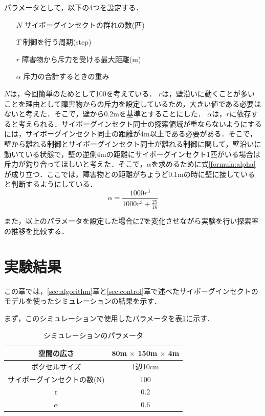 \documentclass[a4paper,11pt]{jarticle}
\begin{document}
	パラメータとして，以下の4つを設定する．
	
	\begin{itemize}
		\item[$N$] サイボーグインセクトの群れの数(匹)
		\item[$T$] 制御を行う周期(step)
		\item[$r$] 障害物から斥力を受ける最大距離(m)
		\item[$\alpha$] 斥力の合計するときの重み
	\end{itemize}

	$N$は，今回簡単のためとして100を考えている．
	$r$は，壁沿いに動くことが多いことを理由として障害物からの斥力を設定しているため，大きい値である必要はないと考えた．そこで，壁から0.2mを基準とすることにした．
	$\alpha$は，$r$に依存すると考えられる．サイボーグインセクト同士の探索領域が重ならないようにするには，サイボーグインセクト同士の距離が4m以上である必要がある．そこで，壁から離れる制御とサイボーグインセクト同士が離れる制御に関して，壁沿いに動いている状態で，壁の逆側4mの距離にサイボーグインセクト1匹がいる場合は斥力が釣り合ってほしいと考えた．そこで，$\alpha$を求めるために式\ref{formula:alpha}が成り立つ．ここでは，障害物との距離がちょうど0.1mの時に壁に接していると判断するようにしている．
	\begin{equation}
	\label{formula:alpha}
	\alpha = \frac{1000r^3}{1000r^3 + \frac{25}{16}}
	\end{equation}
	
	また，以上のパラメータを設定した場合に$T$を変化させながら実験を行い探索率の推移を比較する．
	\section{実験結果}
	\label{sec:result}
	
	この章では，\ref{sec:algorithm}章と\ref{sec:control}章で述べたサイボーグインセクトのモデルを使ったシミュレーションの結果を示す．
	
	まず，このシミュレーションで使用したパラメータを表\ref{tab:simu}に示す．
	\begin{table}
		\centering
		\caption{シミュレーションのパラメータ}
		\begin{tabular}{|c|c|}
			\hline
			空間の広さ & 80m $\times$ 150m $\times$ 4m\\ \hline
			ボクセルサイズ & 1辺10cm \\ \hline
			サイボーグインセクトの数(N) & 100 \\ \hline
			r & 0.2 \\ \hline
			$\alpha$ & 0.6 \\ \hline
		\end{tabular}
	\label{tab:simu}
	\end{table}
\end{document}
